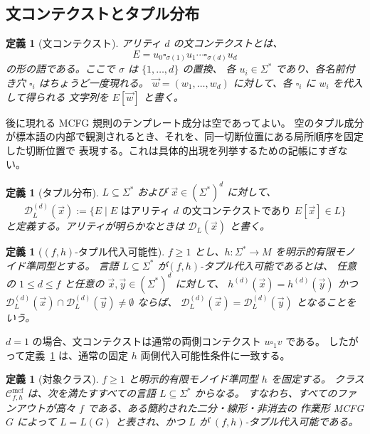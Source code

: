 \documentclass[11pt,a4paper]{ltjsarticle}
\newtheorem{definition}[theorem]{定義}
\theoremstyle{remark}
\newcommand{\Cmcf}[2]{\mathcal{C}^{\mathrm{mcf}}_{#1,#2}}
\newcommand{\D}{\mathcal{D}}
\newcommand{\tuple}[1]{\vec{#1}}
\newcommand{\blank}{\square}
\begin{document}
\subsection{文コンテクストとタプル分布}

\begin{definition}[文コンテクスト]
\label{def:sentence-context}
\emph{アリティ \(d\) の文コンテクスト}とは、
\[
  E=u_0\blank_{\sigma(1)}u_1\cdots\blank_{\sigma(d)}u_d
\]
の形の語である。ここで \(\sigma\) は \(\{1,\ldots,d\}\) の置換、
各 \(u_i\in\Sigma^*\) であり、各名前付き穴 \(\blank_i\) はちょうど一度現れる。
\(\tuple w=(w_1,\ldots,w_d)\) に対して、各 \(\blank_i\) に \(w_i\) を代入して得られる
文字列を \(E[\tuple w]\) と書く。
\end{definition}

後に現れる MCFG 規則のテンプレート成分は空であってよい。
空のタプル成分が標本語の内部で観測されるとき、それを、同一切断位置にある局所順序を固定した切断位置で
表現する。これは具体的出現を列挙するための記帳にすぎない。

\begin{definition}[タプル分布]
\label{def:tuple-distribution}
\(L\subseteq\Sigma^*\) および \(\tuple x\in(\Sigma^*)^d\) に対して、
\[
\D_L^{(d)}(\tuple x):=
\{E\mid E\text{ はアリティ }d\text{ の文コンテクストであり }E[\tuple x]\in L\}
\]
と定義する。アリティが明らかなときは \(\D_L(\tuple x)\) と書く。
\end{definition}

\begin{definition}[\((f,h)\)-タプル代入可能性]
\label{def:tuple-substitutable}
\(f\ge1\) とし、\(h\colon\Sigma^*\to M\) を明示的有限モノイド準同型とする。
言語 \(L\subseteq\Sigma^*\) が\emph{\((f,h)\)-タプル代入可能}であるとは、
任意の \(1\le d\le f\) と任意の
\(\tuple x,\tuple y\in(\Sigma^*)^d\) に対して、
\(h^{(d)}(\tuple x)=h^{(d)}(\tuple y)\) かつ
\(\D_L^{(d)}(\tuple x)\cap\D_L^{(d)}(\tuple y)\ne\emptyset\) ならば、
\(\D_L^{(d)}(\tuple x)=\D_L^{(d)}(\tuple y)\) となることをいう。
\end{definition}

\(d=1\) の場合、文コンテクストは通常の両側コンテクスト \(u\blank_1v\) である。
したがって定義~\ref{def:tuple-substitutable} は、通常の固定 \(h\) 両側代入可能性条件に一致する。

\begin{definition}[対象クラス]
\label{def:class-cmcf}
\(f\ge1\) と明示的有限モノイド準同型 \(h\) を固定する。
クラス \(\Cmcf{f}{h}\) は、次を満たすすべての言語 \(L\subseteq\Sigma^*\) からなる。
すなわち、すべてのファンアウトが高々 \(f\) である、ある簡約された二分・線形・非消去の
作業形 MCFG \(G\) によって \(L=L(G)\) と表され、かつ \(L\) が
\((f,h)\)-タプル代入可能である。
\end{definition}
\end{document}
